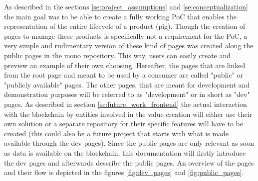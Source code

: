 \documentclass[oneside,a4paper,12pt, colorinlistoftodos]{article} %
\begin{document}
As described in the sections \ref{se:project_assumptions} and \ref{se:conceptualization} the main goal was to be able to create a fully working PoC that enables the representation of the entire lifecycle of a product (pig). Though the creation of pages to manage these products is specifically not a requirement for the PoC, a very simple and rudimentary version of these kind of pages was created along the public pages in the mono repository. This way, users can easily create and preview an example of their own choosing. Hereafter, the pages that are linked from the root page and meant to be used by a consumer are called "public" or "publicly available" pages. The other pages, that are meant for development and demonstration purposes will be referred to as "development" or in short as "dev" pages. As described in section \ref{se:future_work_frontend} the actual interaction with the blockchain by entities involved in the value creation will either use their own solution or a separate repository for their specific features will have to be created (this could also be a future project that starts with what is made available through the dev pages). Since the public pages are only relevant as soon as data is available on the blockchain, this documentation will firstly introduce the dev pages and afterwards describe the public pages. An overview of the pages and their flow is depicted in the figures \ref{fig:dev_pages} and \ref{fig:public_pages}.
\end{document}
